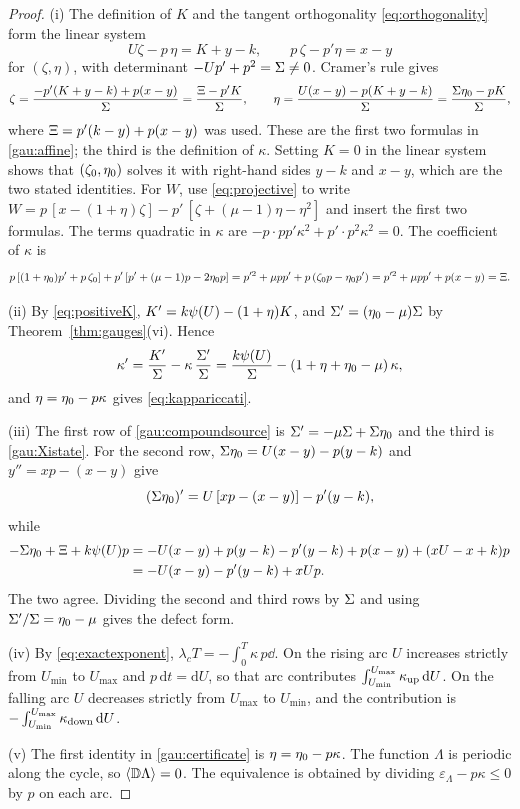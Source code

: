 \begin{proof}
(i) The definition of $K$ and the tangent orthogonality \eqref{eq:orthogonality} form the linear system
\[
U\zeta-p\,\eta=K+y-k,\qquad p\,\zeta-p'\eta=x-y
\]
for $(\zeta,\eta)$, with determinant $-Up'+p^2=\Sigma\ne0$. Cramer's rule gives
\[
\zeta=\frac{-p'(K+y-k)+p(x-y)}{\Sigma}=\frac{\Xi-p'K}{\Sigma},\qquad
\eta=\frac{U(x-y)-p(K+y-k)}{\Sigma}=\frac{\Sigma\eta_0-pK}{\Sigma},
\]
where $\Xi=p'(k-y)+p(x-y)$ was used. These are the first two formulas in \eqref{gau:affine}; the third is the definition of $\kappa$. Setting $K=0$ in the linear system shows that $(\zeta_0,\eta_0)$ solves it with right-hand sides $y-k$ and $x-y$, which are the two stated identities. For $W$, use \eqref{eq:projective} to write $W=p\,[x-(1+\eta)\zeta]-p'\,[\zeta+(\mu-1)\eta-\eta^2]$ and insert the first two formulas. The terms quadratic in $\kappa$ are $-p\cdot pp'\kappa^2+p'\cdot p^2\kappa^2=0$. The coefficient of $\kappa$ is
\[
p\,[(1+\eta_0)p'+p\,\zeta_0]+p'\,[p'+(\mu-1)p-2\eta_0 p]=p'^2+\mu pp'+p\,(\zeta_0p-\eta_0 p')=p'^2+\mu pp'+p(x-y)=\Xi .
\]

(ii) By \eqref{eq:positiveK}, $K'=k\psi(U)-(1+\eta)K$, and $\Sigma'=(\eta_0-\mu)\Sigma$ by Theorem~\ref{thm:gauges}(vi). Hence
\[
\kappa'=\frac{K'}{\Sigma}-\kappa\,\frac{\Sigma'}{\Sigma}=\frac{k\psi(U)}{\Sigma}-(1+\eta+\eta_0-\mu)\,\kappa ,
\]
and $\eta=\eta_0-p\kappa$ gives \eqref{eq:kappariccati}.

(iii) The first row of \eqref{gau:compoundsource} is $\Sigma'=-\mu\Sigma+\Sigma\eta_0$ and the third is \eqref{gau:Xistate}. For the second row, $\Sigma\eta_0=U(x-y)-p(y-k)$ and $y''=xp-(x-y)$ give
\[
(\Sigma\eta_0)'=U\,[xp-(x-y)]-p'(y-k),
\]
while
\begin{align*}
-\Sigma\eta_0+\Xi+k\psi(U)p&=-U(x-y)+p(y-k)-p'(y-k)+p(x-y)+(xU-x+k)p\\
&=-U(x-y)-p'(y-k)+xUp .
\end{align*}
The two agree. Dividing the second and third rows by $\Sigma$ and using $\Sigma'/\Sigma=\eta_0-\mu$ gives the defect form.

(iv) By \eqref{eq:exactexponent}, $\lambda_cT=-\int_0^T\kappa\,p\dd$. On the rising arc $U$ increases strictly from $U_{\min}$ to $U_{\max}$ and $p\,\mathrm dt=\mathrm dU$, so that arc contributes $\int_{U_{\min}}^{U_{\max}}\kappa_{\rm up}\,\mathrm dU$. On the falling arc $U$ decreases strictly from $U_{\max}$ to $U_{\min}$, and the contribution is $-\int_{U_{\min}}^{U_{\max}}\kappa_{\rm down}\,\mathrm dU$.

(v) The first identity in \eqref{gau:certificate} is $\eta=\eta_0-p\kappa$. The function $\Lambda$ is periodic along the cycle, so $\left\langle \mathbb D\Lambda\right\rangle=0$. The equivalence is obtained by dividing $\varepsilon_\Lambda-p\kappa\le0$ by $p$ on each arc.


\end{proof}
